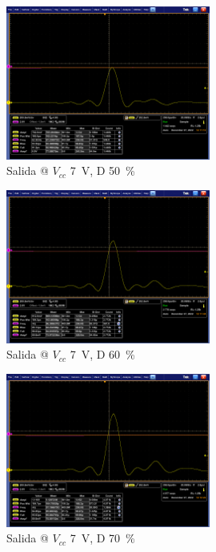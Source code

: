 \begin{figure}
  \centering
    \includegraphics[width=0.6\textwidth]{images/mediciones/vcc_7v_duty_50.png}
    \caption{Salida @ $V_{cc}$ \qty{7}{\volt}, D \qty{50}{\percent} }
    \label{fig:mediciones_7v_50}
\end{figure}

\begin{figure}
  \centering
    \includegraphics[width=0.6\textwidth]{images/mediciones/vcc_7v_duty_60.png}
    \caption{Salida @ $V_{cc}$ \qty{7}{\volt}, D \qty{60}{\percent} }
    \label{fig:mediciones_7v_60}
\end{figure}

\begin{figure}
  \centering
    \includegraphics[width=0.6\textwidth]{images/mediciones/vcc_7v_duty_70.png}
    \caption{Salida @ $V_{cc}$ \qty{7}{\volt}, D \qty{70}{\percent} }
    \label{fig:mediciones_7v_70}
\end{figure}

